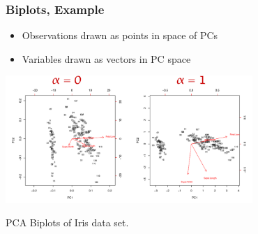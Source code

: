 \documentclass{beamer}
\begin{document}

\begin{frame}
  \frametitle{Biplots, Example}

\begin{itemize}
\item Observations drawn as points in space of PCs
\item Variables drawn as vectors in PC space
\end{itemize}

\medskip

\centerline{
\includegraphics[height=1.9in]{fig-irisbiplot-simple.pdf}
}
\begin{center}
PCA Biplots of Iris data set.
\end{center}

\end{frame}

\end{document}
